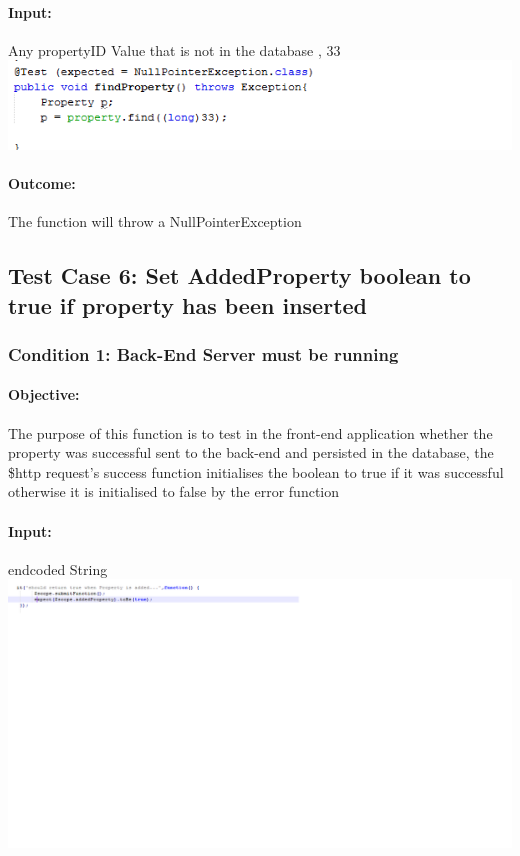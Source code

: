 \documentclass[a4paper,12pt]{article}
\begin{document}
\paragraph{Input:} Any propertyID Value that is not in the database , 33\\
\includegraphics[width=1\textwidth]{./Images/input5.png}

\paragraph{Outcome: } The function will throw a NullPointerException

\subsection{Test Case 6: Set AddedProperty boolean to true if property has been inserted}
\subsubsection{Condition 1: Back-End Server must be running}
\paragraph{Objective:}The purpose of this function is to test in the front-end application whether the property was successful sent to the back-end and persisted in the database, the \$http request's success function initialises the boolean to true if it was successful otherwise it is initialised to false by the error function
\paragraph{Input:} endcoded String\\
\includegraphics[width=1\textwidth]{./Images/input6.png}
\end{document}
